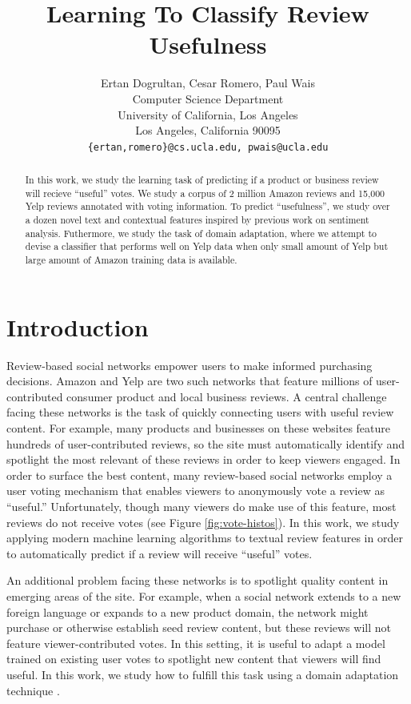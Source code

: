 \documentclass[letterpaper]{article}
\title{Learning To Classify Review Usefulness}
\author{Ertan Dogrultan, Cesar Romero, Paul Wais\\
Computer Science Department \\
University of California, Los Angeles\\
Los Angeles, California 90095\\
\texttt{\{ertan,romero\}@cs.ucla.edu, pwais@ucla.edu}}
\begin{document}
\maketitle
\begin{abstract}
  In this work, we study the learning task of predicting if a product or 
  business review will recieve ``useful'' votes.  We study a corpus of
  2 million Amazon reviews and 15,000 Yelp reviews annotated
  with voting information.  To predict ``usefulness'', we study over a dozen 
  novel text and contextual features inspired by previous work on 
  sentiment analysis.  Futhermore, we study the task of domain adaptation,
  where we attempt to devise a classifier that performs well on Yelp data
  when only small amount of Yelp but large amount of Amazon training data
  is available.
\end{abstract}

\section{Introduction}
\label{sec:introduction}

Review-based social networks empower users to make informed purchasing
decisions.  Amazon and Yelp are two such networks that feature
millions of user-contributed consumer product and local business
reviews.  A central challenge facing these networks is the task of
quickly connecting users with useful review content.  For example,
many products and businesses on these websites feature hundreds of
user-contributed reviews, so the site must automatically identify and
spotlight the most relevant of these reviews in order to keep viewers
engaged.  In order to surface the best content, many review-based
social networks employ a user voting mechanism that enables viewers to
anonymously vote a review as ``useful.''  Unfortunately, though many
viewers do make use of this feature, most reviews do not receive votes
(see Figure \ref{fig:vote-histos}).  In this work, we study applying modern
machine learning algorithms to textual review features in order to
automatically predict if a review will receive ``useful'' votes.

An additional problem facing these networks is to spotlight quality
content in emerging areas of the site.  For example, when a social
network extends to a new foreign language or expands to a new product
domain, the network might purchase or otherwise establish seed review
content, but these reviews will not feature viewer-contributed votes.
In this setting, it is useful to adapt a model trained on existing
user votes to spotlight new content that viewers will find useful.  In
this work, we study how to fulfill this task using a domain adaptation
technique \cite{JennLearnDiffDomains}.
\end{document}
